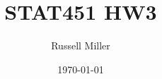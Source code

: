 \documentclass{article}
\title{STAT451 HW3}
\author{Russell Miller}
\date{\today}
\begin{document}
\maketitle

\paragraph{}
\begin{center}
$\boxed{}$
\end{center}
\end{document}
